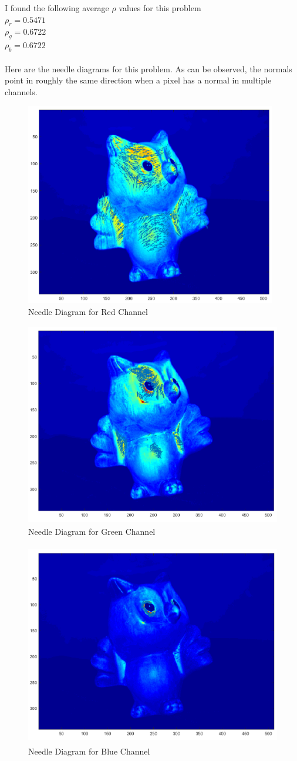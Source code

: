 \documentclass[11pt,psfig]{article}
\begin{document}
I found the following average $\rho$ values for this problem\\
$\rho_r = 0.5471$\\
$\rho_g = 0.6722$\\
$\rho_b = 0.6722$\\
\\
Here are the needle diagrams for this problem. As can be observed, the normals point in roughly the same direction when a pixel has a normal in multiple channels. 
\begin{figure}[H]
\centering
\includegraphics[height=3.5in]{prob4needlePlot1.png}
\caption{Needle Diagram for Red Channel}
\end{figure}
\begin{figure}[H]
\centering
\includegraphics[height=3.5in]{prob4needlePlot2.png}
\caption{Needle Diagram for Green Channel}
\end{figure}
\begin{figure}[H]
\centering
\includegraphics[height=3.5in]{prob4needlePlot3.png}
\caption{Needle Diagram for Blue Channel}
\end{figure}
\end{document}
